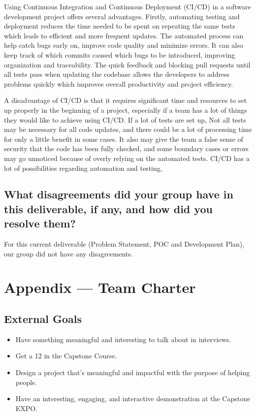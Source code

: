 \documentclass{article}
\begin{document}
Using Continuous Integration and Continuous Deployment (CI/CD) in a software development project offers several 
advantages. Firstly, automating testing and deployment reduces the time needed to be spent on repeating the same tests which
leads to efficient and more frequent updates. The automated process can help catch bugs early on, improve code quality 
and minimize errors. It can also keep track of which commits caused which bugs to be introduced, improving organization
and traceability. The quick feedback and blocking pull requests until all tests pass when updating the codebase allows 
the developers to address problems quickly which improves overall productivity and project efficiency.

A disadvantage of CI/CD is that it requires significant time and resources to set up properly in the beginning of a 
project, especially if a team has a lot of things they would like to achieve using CI/CD. If a lot of tests are set up, 
Not all tests may be necessary for all code updates, and there could be a lot of processing time for only a little 
benefit in some cases. It also may give the team a false sense of security that the code has been fully checked, 
and some boundary cases or errors may go unnoticed because of overly relying on the automated tests. CI/CD has a 
lot of possibilities regarding automation and testing, 

\subsection*{What disagreements did your group have in this deliverable, if any, and how did you resolve them?}

For this current deliverable (Problem Statement, POC and Development Plan), our group did not have any disagreements.

\newpage{}

\section*{Appendix --- Team Charter}

\subsection*{External Goals}

\begin{itemize}
\item Have something meaningful and interesting to talk about in interviews.
\item Get a 12 in the Capstone Course.
\item Design a project that's meaningful and impactful with the purpose of helping people.
\item Have an interesting, engaging, and interactive demonstration at the Capstone EXPO.
\end{itemize}
\end{document}
